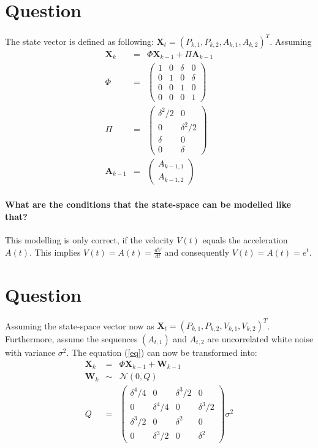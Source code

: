 \documentclass[a4paper, 12pt, titlepage]{article}
\begin{document}
\section{Question}

The state vector is defined as following: $\pmb{X}_t=(P_{k,1},P_{k,2},A_{k,1},A_{k,2})^T$.
Assuming 
\begin{eqnarray}
	\pmb{X}_{k} &=& \Phi \pmb{X}_{k-1} + \Pi \pmb{A}_{k-1} \label{eq}\\
	\Phi &=& \left(
		\begin{array}{cccc}
			1 &0 & \delta & 0\\
			0 & 1& 0 & \delta\\
			0 & 0& 1& 0\\
			0 & 0& 0& 1
		\end{array}
	\right)\\
	\Pi &=& \left(
		\begin{array}{cc}
			\delta^2/2 & 0\\
			0 & \delta^2/2\\
			\delta& 0\\
			0 & \delta
		\end{array}
	\right)\\
	\pmb{A}_{k-1} &=& \left (
		\begin{array}{c}
			A_{k-1,1}\\
			A_{k-1,2}
		\end{array}
	\right)
\end{eqnarray}

\paragraph{What are the conditions that the state-space can be modelled like that?}
This modelling is only correct, if the velocity $V(t)$ equals the acceleration $A(t)$. 
This implies $V(t)=A(t)=\frac{dV}{dt}$ and consequently $V(t)=A(t)=e^t$.

\section{Question}

Assuming the state-space vector now as $\pmb{X}_t=(P_{k,1},P_{k,2},V_{k,1},V_{k,2})^T$.
Furthermore, assume the sequences $(A_{t,1})$ and $A_{t,2}$ are uncorrelated white noise with variance $\sigma^2$.
The equation (\ref{eq}) can now be transformed into:
\begin{eqnarray}
	\pmb{X}_{k} &=& \Phi \pmb{X}_{k-1} + \pmb{W}_{k-1}\\
	\pmb{W}_{k} &\sim& \mathcal{N}(0,Q)\\
	Q&=& \left(
		\begin{array}{cccc}
		\delta^4/4& 0& \delta^3/2 & 0\\
		0 & \delta^4/4 & 0& \delta^3/2\\
		\delta^3/2 & 0& \delta^2 &0\\
		0 & \delta^3/2 & 0 & \delta^2
		\end{array}
	\right)\sigma^2
\end{eqnarray}
\end{document}
